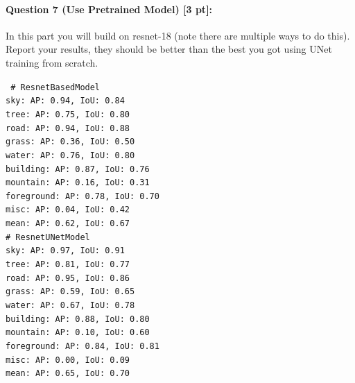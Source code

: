 \documentclass[11pt]{article}
\begin{document}
\paragraph{Question 7 (Use Pretrained Model) [3 pt]:} 
In this part you will build on resnet-18 (note there are multiple ways to do this). Report your results, they should be better than the best you got using UNet training from scratch.

{\centering \tt \small
\# ResnetBasedModel \\
sky: AP: 0.94, IoU: 0.84 \\
tree: AP: 0.75, IoU: 0.80 \\
road: AP: 0.94, IoU: 0.88 \\
grass: AP: 0.36, IoU: 0.50 \\
water: AP: 0.76, IoU: 0.80 \\
building: AP: 0.87, IoU: 0.76 \\
mountain: AP: 0.16, IoU: 0.31 \\
foreground: AP: 0.78, IoU: 0.70 \\
misc: AP: 0.04, IoU: 0.42 \\
mean: AP: 0.62, IoU: 0.67 \\

\# ResnetUNetModel \\
sky: AP: 0.97, IoU: 0.91 \\
tree: AP: 0.81, IoU: 0.77 \\
road: AP: 0.95, IoU: 0.86 \\
grass: AP: 0.59, IoU: 0.65 \\
water: AP: 0.67, IoU: 0.78 \\
building: AP: 0.88, IoU: 0.80 \\
mountain: AP: 0.10, IoU: 0.60 \\
foreground: AP: 0.84, IoU: 0.81 \\
misc: AP: 0.00, IoU: 0.09 \\
mean: AP: 0.65, IoU: 0.70 \\
}
\end{document}
